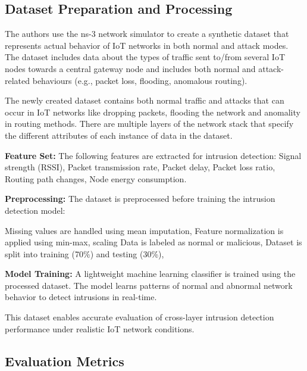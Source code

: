 \documentclass[a4paper,fleqn]{cas-dc}
\numberwithin{equation}{section}
\begin{document}
\subsection{Dataset Preparation and Processing}

The authors use the ns-3 network simulator to create a synthetic dataset that represents actual behavior of IoT networks in both normal and attack modes. The dataset includes data about the types of traffic sent to/from several IoT nodes towards a central gateway node and includes both normal and attack-related behaviours (e.g., packet loss, flooding, anomalous routing).

The newly created dataset contains both normal traffic and attacks that can occur in IoT networks like dropping packets, flooding the network and anomality in routing methods. There are multiple layers of the network stack that specify the different attributes of each instance of data in the dataset.

\textbf{Feature Set:}
The following features are extracted for intrusion detection:
 Signal strength (RSSI),
Packet transmission rate,
Packet delay,
 Packet loss ratio,
Routing path changes,
Node energy consumption.


\textbf{Preprocessing:}
The dataset is preprocessed before training the intrusion detection model:


 Missing values are handled using mean imputation,
 Feature normalization is applied using min-max, scaling
 Data is labeled as normal or malicious,
 Dataset is split into training (70\%) and testing (30\%),


\textbf{Model Training:}
A lightweight machine learning classifier is trained using the processed dataset. The model learns patterns of normal and abnormal network behavior to detect intrusions in real-time.

This dataset enables accurate evaluation of cross-layer intrusion detection performance under realistic IoT network conditions.
\subsection{Evaluation Metrics}
\end{document}

